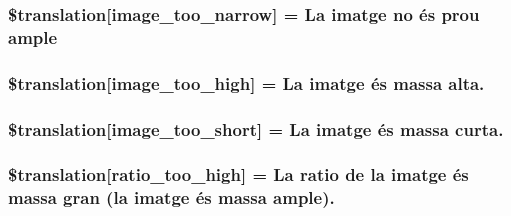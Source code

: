 \subsubsection[{\$translation}]{\setlength{\rightskip}{0pt plus 5cm}\$translation\mbox{[}\textquotesingle{}image\+\_\+too\+\_\+narrow\textquotesingle{}\mbox{]} = \textquotesingle{}La imatge no és prou ample\textquotesingle{}}\label{class_8upload_8ca___c_a_8php_a5c9a4cd67fd21c32e0a3b434591a6037}
\hypertarget{class_8upload_8ca___c_a_8php_aa27bde361343f3b63c7cd441860024f8}{}
\subsubsection[{\$translation}]{\setlength{\rightskip}{0pt plus 5cm}\$translation\mbox{[}\textquotesingle{}image\+\_\+too\+\_\+high\textquotesingle{}\mbox{]} = \textquotesingle{}La imatge és massa alta.\textquotesingle{}}\label{class_8upload_8ca___c_a_8php_aa27bde361343f3b63c7cd441860024f8}
\hypertarget{class_8upload_8ca___c_a_8php_a86fcd4e1157b00032df451188d735527}{}
\subsubsection[{\$translation}]{\setlength{\rightskip}{0pt plus 5cm}\$translation\mbox{[}\textquotesingle{}image\+\_\+too\+\_\+short\textquotesingle{}\mbox{]} = \textquotesingle{}La imatge és massa curta.\textquotesingle{}}\label{class_8upload_8ca___c_a_8php_a86fcd4e1157b00032df451188d735527}
\hypertarget{class_8upload_8ca___c_a_8php_a23396f6ce7f31e5e5f1b57580621d982}{}
\subsubsection[{\$translation}]{\setlength{\rightskip}{0pt plus 5cm}\$translation\mbox{[}\textquotesingle{}ratio\+\_\+too\+\_\+high\textquotesingle{}\mbox{]} = \textquotesingle{}La ratio de la imatge és massa gran (la imatge és massa ample).\textquotesingle{}}\label{class_8upload_8ca___c_a_8php_a23396f6ce7f31e5e5f1b57580621d982}
\hypertarget{class_8upload_8ca___c_a_8php_ac533b9a479f056b0b8623e4268f068c2}{}
